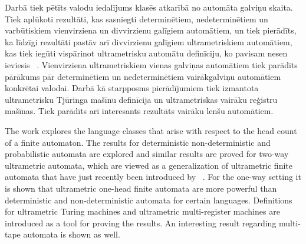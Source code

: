 \documentclass{ludis}
\begin{document}
\maketitle

\begin{abstract-lv}
Darbā tiek pētīts valodu iedalījums klasēs atkarībā no automāta galviņu skaita. Tiek aplūkoti rezultāti, kas sasniegti determinētiem, nedeterminētiem un varbūtiskiem vienvirziena un divvirzienu galīgiem automātiem, un tiek pierādīts, ka līdzīgi rezultāti pastāv arī divvirzienu galīgiem ultrametriskiem automātiem, kas tiek iegūti vispārinot ultrametrisku automātu definīciju, ko pavisam nesen ieviesis
~\citet{Freivalds2012}.
Vienvirziena ultrametriskiem vienas galviņas automātiem tiek parādīts pārākums pār determinētiem un nedeterminētiem vairākgalviņu automātiem konkrētai valodai. Darbā kā starpposms pierādījumiem tiek izmantota ultrametrisku Tjūringa mašīnu definīcija un ultrametriskas vairāku reģistru mašīnas. Tiek parādīts arī interesants rezultāts vairāku lenšu automātiem.
\end{abstract-lv}
\clearpage

\begin{abstract-en}
The work explores the language classes that arise with respect to the head count of a finite automaton. The results for deterministic non-deterministic and probabilistic automata are explored and similar results are proved for two-way ultrametric automata, which are viewed as a generalization of ultrametric finite automata that have just recently been introduced by ~\citet{Freivalds2012}. For the one-way setting it is shown that ultrametric one-head finite automata are more powerful than deterministic and non-deterministic automata for certain languages. Definitions for ultrametric Turing machines and ultrametric multi-register machines are introduced as a tool for proving the results. An interesting result regarding multi-tape automata is shown as well.
\end{abstract-en}


\tableofcontents
\end{document}
